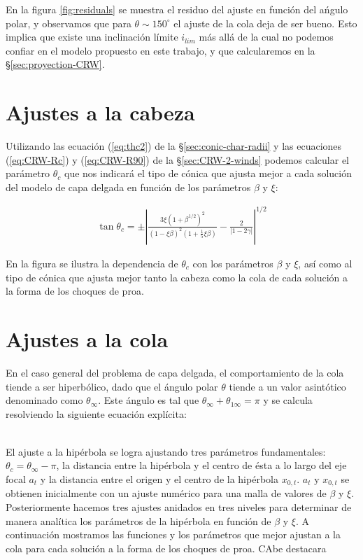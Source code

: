 En la figura \ref{fig:residuals} se muestra el residuo del ajuste en función del ańgulo polar, y observamos que para $\theta\sim 150^\circ$ el ajuste de la cola deja de ser bueno. Esto implica que existe una inclinación límite $i_{lim}$ más allá de la cual no podemos confiar en el modelo propuesto en este trabajo, y que calcularemos en la \S \ref{sec:proyection-CRW}.

\section{Ajustes a la cabeza}

Utilizando las ecuación (\ref{eq:thc2})  de la \S \ref{sec:conic-char-radii} y las ecuaciones (\ref{eq:CRW-Rc}) y (\ref{eq:CRW-R90}) de la \S \ref{sec:CRW-2-winds} podemos calcular el parámetro $\theta_c$ que nos indicará el tipo de cónica que ajusta mejor a cada solución del modelo de capa delgada
en función de los parámetros $\beta$ y $\xi$: 

 \begin{align}
   \tan\theta_c = \pm\left|\frac{3\xi\left(1 + \beta^{1/2}\right)^2}{\left(1 - \xi\beta\right)^2
   \left(1 + \frac{1}{5}\xi\beta\right)} - \frac{2}{\left|1 - 2\gamma\right|}\right|^{1/2}
 \end{align}

 En la figura  se ilustra la dependencia de $\theta_c$ con los parámetros $\beta$ y $\xi$, así como al tipo de cónica que ajusta mejor tanto la cabeza como la cola de cada solución a la forma de los choques de proa.
 
 \section{Ajustes a la cola}
\label{sec:tail-fit}
 En el caso general del problema de capa delgada, el comportamiento de la cola tiende a ser hiperbólico, dado que
 el ángulo polar $\theta$ tiende a un valor asintótico denominado como $\theta_\infty$. Este ángulo es tal que
 $\theta_\infty + \theta_{1\infty} = \pi$ y se calcula resolviendo la siguiente ecuación explícita:

 \begin{align}
   
 \end{align}

 El ajuste a la hipérbola se logra ajustando tres parámetros fundamentales: $\theta_c = \theta_\infty - \pi$, la distancia entre la hipérbola y el centro de ésta a lo largo del eje focal $a_t$ y la distancia entre el origen y el centro de la hipérbola $x_{0,t}$. $a_t$ y $x_{0,t}$ se obtienen inicialmente con un ajuste numérico para una malla de valores de $\beta$ y $\xi$. Posteriormente hacemos tres ajustes anidados en tres niveles para determinar de manera analítica los parámetros de la hipérbola en función de $\beta$ y $\xi$. A continuación mostramos las funciones y los parámetros que mejor ajustan a la cola para cada solución a la forma de los choques de proa. CAbe destacara

